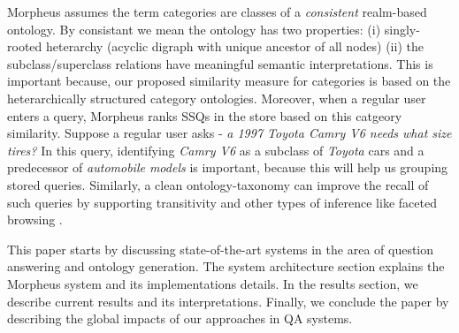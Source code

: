 Morpheus assumes the term categories are classes of a
\textit{consistent} realm-based ontology. By consistant we mean the ontology has two
properties: (i) singly-rooted heterarchy (acyclic digraph with unique 
ancestor of all nodes) (ii) the subclass/superclass relations have meaningful 
semantic interpretations. This is important because, our proposed similarity 
measure for categories is based on the heterarchically
structured category ontologies. Moreover, when a regular user enters a query,
Morpheus ranks SSQs in the store based on this catgeory similarity. Suppose a
regular user asks -\textit{ a 1997 Toyota Camry V6 needs what size tires?} In
this query, identifying \textit{Camry V6} as a subclass of \textit{Toyota} cars
and a predecessor of \textit{automobile models} is important, because this will
help us grouping stored queries. Similarly, a clean ontology-taxonomy can
improve the recall of such queries by supporting transitivity and other types of
inference like faceted browsing \cite{Wu2008}.   


This paper starts by discussing state-of-the-art systems in the area of
question answering and ontology generation. The system
architecture section explains the Morpheus system and its implementations
details. In the results section, we describe current results and its
interpretations. Finally, we conclude the paper by describing the global impacts
of our approaches in QA systems.
